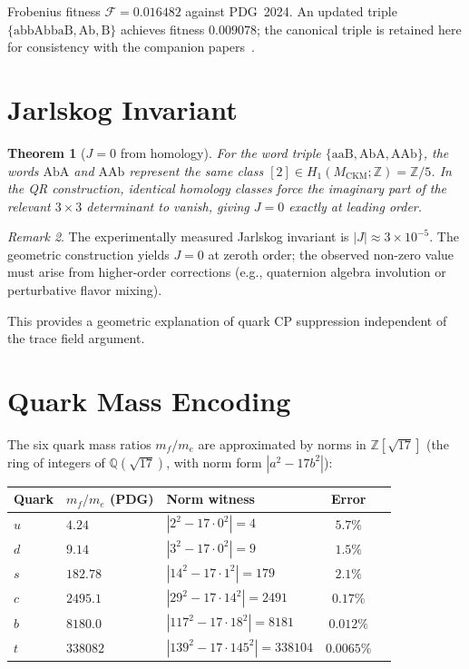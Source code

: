 \documentclass[11pt,a4paper]{article}
\newtheorem{theorem}{Theorem}
\theoremstyle{remark}
\newtheorem{remark}[theorem]{Remark}
\newcommand{\MCKM}{M_{\mathrm{CKM}}}
\newcommand{\Zfive}{\mathbb{Z}/5}
\newcommand{\QQ}{\mathbb{Q}}
\newcommand{\ZZ}{\mathbb{Z}}
\begin{document}
Frobenius fitness $\mathcal{F} = 0.016482$ against PDG~2024.
An updated triple $\{\mathrm{abbAbbaB},\mathrm{Ab},\mathrm{B}\}$
achieves fitness $0.009078$; the canonical triple is retained here
for consistency with the companion papers~\cite{Gentry:Unified}.

\section{Jarlskog Invariant}
\label{sec:jarlskog}

\begin{theorem}[$J=0$ from homology]
\label{thm:J}
For the word triple $\{\mathrm{aaB},\mathrm{AbA},\mathrm{AAb}\}$,
the words $\mathrm{AbA}$ and $\mathrm{AAb}$ represent the same
class $[2] \in H_1(\MCKM;\ZZ) = \Zfive$.
In the QR construction, identical homology classes force the
imaginary part of the relevant $3\times3$ determinant to vanish,
giving $J = 0$ exactly at leading order.
\end{theorem}

\begin{remark}
The experimentally measured Jarlskog invariant is $|J|\approx3\times10^{-5}$.
The geometric construction yields $J=0$ at zeroth order; the observed
non-zero value must arise from higher-order corrections (e.g., quaternion
algebra involution or perturbative flavor mixing).
\end{remark}

This provides a geometric explanation of quark CP suppression
independent of the trace field argument.

\section{Quark Mass Encoding}
\label{sec:mass}

The six quark mass ratios $m_f/m_e$ are approximated by norms in
$\ZZ[\sqrt{17}]$ (the ring of integers of $\QQ(\sqrt{17})$,
with norm form $|a^2-17b^2|$):

\begin{center}
\begin{tabular}{lllcc}
\toprule
Quark & $m_f/m_e$ (PDG) & Norm witness & Error \\
\midrule
$u$ & $4.24$   & $|2^2 - 17\cdot0^2|=4$          & $5.7\%$ \\
$d$ & $9.14$   & $|3^2 - 17\cdot0^2|=9$          & $1.5\%$ \\
$s$ & $182.78$ & $|14^2-17\cdot1^2|=179$          & $2.1\%$ \\
$c$ & $2495.1$ & $|29^2-17\cdot14^2|=2491$        & $0.17\%$ \\
$b$ & $8180.0$ & $|117^2-17\cdot18^2|=8181$       & $0.012\%$ \\
$t$ & $338082$ & $|139^2-17\cdot145^2|=338104$    & $0.0065\%$ \\
\bottomrule
\end{tabular}
\end{center}
\end{document}

